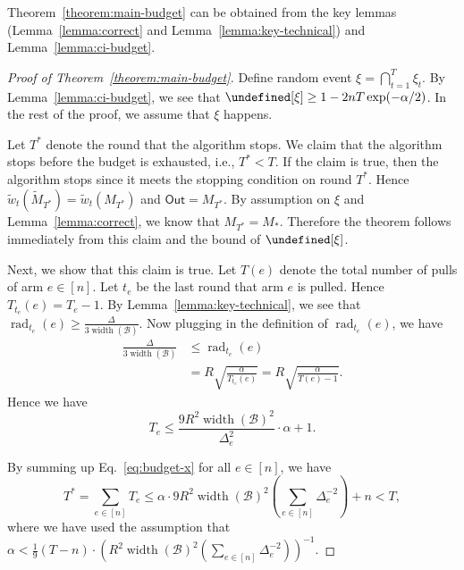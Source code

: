 \documentclass{article}
\newcommand{\B}{\mathcal B}
\DeclareMathOperator{\rank}{width}
\DeclareMathOperator{\rad}{rad}
\newcommand{\out}{\mathsf{Out}}
\let\Pr\undefined
\DeclareMathOperator{\Pr}{Pr}
\begin{document}
Theorem~\ref{theorem:main-budget} can be obtained from the key lemmas (Lemma~\ref{lemma:correct} and Lemma~\ref{lemma:key-technical}) and Lemma~\ref{lemma:ci-budget}.
\begin{proof}[Proof of Theorem~\ref{theorem:main-budget}]
Define random event $\xi=\bigcap_{t=1}^T \xi_t$. 
By Lemma~\ref{lemma:ci-budget}, we see that $\Pr[\xi] \ge 1-2nT\exp(-\alpha/2)$.
In the rest of the proof, we assume that $\xi$ happens.

Let $T^*$ denote the round that the algorithm stops.
We claim that the algorithm stops before the budget is exhausted, i.e., $T^* < T$.
If the claim is true, then the algorithm stops since it meets the stopping condition on round $T^*$.
Hence $\tilde w_t(\tilde M_{T^*}) = \tilde w_t(M_{T^*})$ and $\out = M_{T^*}$.
By assumption on $\xi$ and Lemma~\ref{lemma:correct}, we know that $M_{T^*} = M_*$.
Therefore the theorem follows immediately from this claim and the bound of $\Pr[\xi]$.

Next, we show that this claim is true.
Let $T(e)$ denote the total number of pulls of arm $e\in[n]$.
Let $t_e$ be the last round that arm $e$ is pulled.
Hence $T_{t_e}(e) = T_e-1$.
By Lemma~\ref{lemma:key-technical}, we see that $\rad_{t_e}(e) \ge \frac{\Delta}{3\rank(\B)}$.
Now plugging in the definition of $\rad_{t_e}(e)$, we have
\begin{align*}
	\frac{\Delta}{3\rank(\B)} &\le \rad_{t_e}(e) \\
										        &= R\sqrt{\frac{\alpha}{T_{t_e}(e)}} = R\sqrt{\frac{\alpha}{T(e) -1}}.
\end{align*}
Hence we have
\begin{equation}
\label{eq:budget-x}
T_e \le \frac{9R^2\rank(\B)^2}{\Delta_e^2}\cdot\alpha+1.
\end{equation}

By summing up Eq.~\eqref{eq:budget-x} for all $e\in [n]$, we have
$$
T^* = \sum_{e\in [n]} T_e \le \alpha \cdot 9R^2\rank(\B)^2 \left(\sum_{e\in[n]}\Delta_e^{-2}\right)+n < T,
$$
where we have used the assumption that $\alpha < \frac{1}9 (T-n) \cdot \left(R^2\rank(\B)^2 \left(\sum_{e\in[n]}\Delta_e^{-2}\right)\right)^{-1}.$

\end{proof}
\end{document}
